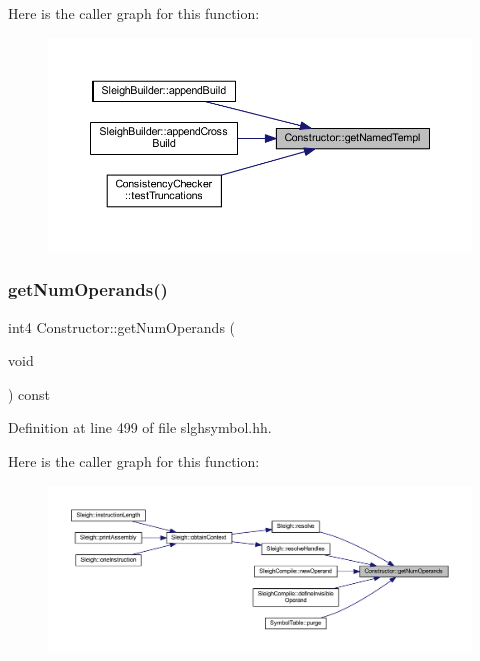 Here is the caller graph for this function\+:
\nopagebreak
\begin{figure}[H]
\begin{center}
\leavevmode
\includegraphics[width=350pt]{class_constructor_afa9add72555c1956fcd48a68b7ff5107_icgraph}
\end{center}
\end{figure}
\mbox{\label{class_constructor_a407d3e6d5d0168bfca04a389c5990ef0}} 
\subsubsection{\texorpdfstring{getNumOperands()}{getNumOperands()}}
{\footnotesize\ttfamily int4 Constructor\+::get\+Num\+Operands (\begin{DoxyParamCaption}\item[{void}]{ }\end{DoxyParamCaption}) const\hspace{0.3cm}{\ttfamily [inline]}}



Definition at line 499 of file slghsymbol.\+hh.

Here is the caller graph for this function\+:
\nopagebreak
\begin{figure}[H]
\begin{center}
\leavevmode
\includegraphics[width=350pt]{class_constructor_a407d3e6d5d0168bfca04a389c5990ef0_icgraph}
\end{center}
\end{figure}
\mbox{\label{class_constructor_a335da57fe897b45b88acfd433b6338df}} 
